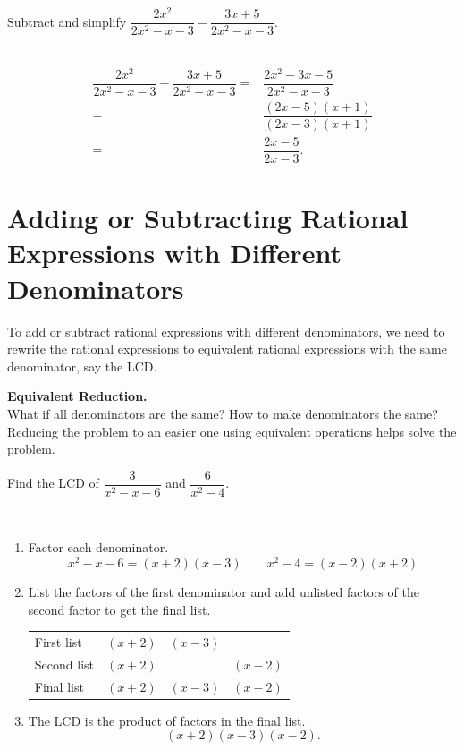 \documentclass[en,11pt]{elegantbook}
\newcommand{\size}[2]{{\fontsize{#1}{0}\selectfont#2}}
\newenvironment{rmdtip}{
	\vspace*{0.5\baselineskip}
	\par\noindent
	\makebox[-3pt][r]{\color{red!90}\size{12}{\HandRight}\,\,}
    \begin{tcolorbox}[
    enhanced,
    title={\textbf{\color{second}Tips}},
    title style={left color=blue!10!green!20!white,right color=yellow!20!blue!20!white},
    colback=cyan!10!white,
    ]
    \sffamily
}{
    \end{tcolorbox}
    \par\ignorespacesafterend
}
\let\BeginKnitrBlock\begin \let\EndKnitrBlock\end
\begin{document}
\BeginKnitrBlock{example}
\protect\hypertarget{exm:unnamed-chunk-44}{}{\label{exm:unnamed-chunk-44} }
Subtract and simplify \(\dfrac{2x^2}{2x^2-x-3}-\dfrac{3x+5}{2x^2-x-3}\).
\EndKnitrBlock{example}

\BeginKnitrBlock{solution}
{}\\

\[
\begin{aligned}
    \dfrac{2x^2}{2x^2-x-3}-\dfrac{3x+5}{2x^2-x-3}=&\dfrac{2x^2-3x-5}{2x^2-x-3}\\
    =&\dfrac{(2x-5)(x+1)}{(2x-3)(x+1)}\\
    =&\dfrac{2x-5}{2x-3}.
\end{aligned}
\]
\EndKnitrBlock{solution}

\hypertarget{adding-or-subtracting-rational-expressions-with-different-denominators}{%
\section{Adding or Subtracting Rational Expressions with Different Denominators}\label{adding-or-subtracting-rational-expressions-with-different-denominators}}

To add or subtract rational expressions with different denominators, we need to rewrite the rational expressions to equivalent rational expressions with the same denominator, say the LCD.

\begin{rmdtip}

\textbf{Equivalent Reduction.}\\
What if all denominators are the same? How to make denominators the same? Reducing the problem to an easier one using equivalent operations helps solve the problem.

\end{rmdtip}

\BeginKnitrBlock{example}
\protect\hypertarget{exm:unnamed-chunk-46}{}{\label{exm:unnamed-chunk-46} }
Find the LCD of \(\dfrac{3}{x^2-x-6}\) and \(\dfrac{6}{x^2-4}\).
\EndKnitrBlock{example}

\BeginKnitrBlock{solution}
{}\\

\begin{enumerate}
\def\labelenumi{\arabic{enumi}.}
\item
  Factor each denominator.
  \[
   x^2-x-6=(x+2)(x-3)\qquad x^2-4=(x-2)(x+2)
  \]
\item
  List the factors of the first denominator and add unlisted factors of the second factor to get the final list.

  \begin{longtable}[]{@{}lccc@{}}
  \toprule
  \endhead
  First list & \((x+2)\) & \((x-3)\) &\tabularnewline
  Second list & \((x+2)\) & & \((x-2)\)\tabularnewline
  Final list & \((x+2)\) & \((x-3)\) & \((x-2)\)\tabularnewline
  \bottomrule
  \end{longtable}
\item
  The LCD is the product of factors in the final list.\\
  \[(x+2)(x-3)(x-2).\]
\end{enumerate}
\EndKnitrBlock{solution}
\end{document}
